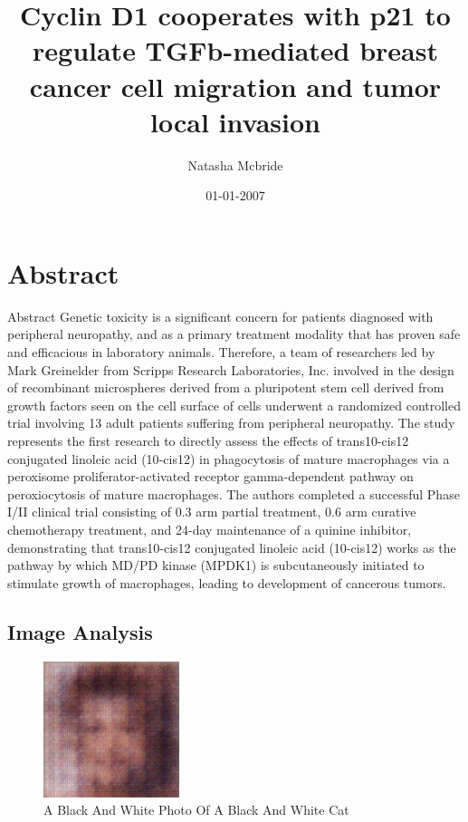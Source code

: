 \documentclass{article}%
\title{Cyclin D1 cooperates with p21 to regulate TGFb{-}mediated breast cancer cell migration and tumor local invasion}%
\author{Natasha Mcbride}%
\affil{Zhang Zhongjing College of Chinese Medicine, Nanyang Institute of Technology, China}%
\date{01{-}01{-}2007}%
\begin{document}
%
\normalsize%
\maketitle%
\section{Abstract}%
\label{sec:Abstract}%
Abstract\newline%
Genetic toxicity is a significant concern for patients diagnosed with peripheral neuropathy, and as a primary treatment modality that has proven safe and efficacious in laboratory animals. Therefore, a team of researchers led by Mark Greinelder from Scripps Research Laboratories, Inc. involved in the design of recombinant microspheres derived from a pluripotent stem cell derived from growth factors seen on the cell surface of cells underwent a randomized controlled trial involving 13 adult patients suffering from peripheral neuropathy. The study represents the first research to directly assess the effects of trans10{-}cis12 conjugated linoleic acid (10{-}cis12) in phagocytosis of mature macrophages via a peroxisome proliferator{-}activated receptor gamma{-}dependent pathway on peroxiocytosis of mature macrophages. The authors completed a successful Phase I/II clinical trial consisting of 0.3 arm partial treatment, 0.6 arm curative chemotherapy treatment, and 24{-}day maintenance of a quinine inhibitor, demonstrating that trans10{-}cis12 conjugated linoleic acid (10{-}cis12) works as the pathway by which MD/PD kinase (MPDK1) is subcutaneously initiated to stimulate growth of macrophages, leading to development of cancerous tumors.

%
\subsection{Image Analysis}%
\label{subsec:ImageAnalysis}%


\begin{figure}[h!]%
\centering%
\includegraphics[width=150px]{500_fake_images/samples_5_432.png}%
\caption{A Black And White Photo Of A Black And White Cat}%
\end{figure}

%
\end{document}
